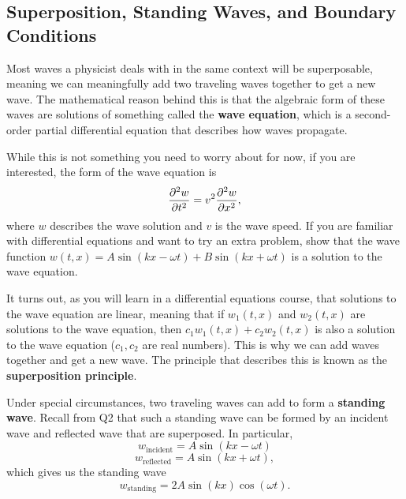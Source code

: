 \documentclass{article}
\begin{document}
\subsection*{Superposition, Standing Waves, and Boundary Conditions}

Most waves a physicist deals with in the same context will be superposable, meaning we can meaningfully add two traveling waves together to get a new wave. The mathematical reason behind this is that the algebraic form of these waves are solutions of something called the \textbf{wave equation}, which is a second-order partial differential equation that describes how waves propagate. 

\begin{tcolorbox}[arc=2mm, title=\textsc{The Wave Equation (Enrichment)}]
	While this is not something you need to worry about for now, if you are interested, the form of the wave equation is 
	\[
		\pdv[2]{w}{t} = v^2 \pdv[2]{w}{x},
	\]
	where $w$ describes the wave solution and $v$ is the wave speed. If you are familiar with differential equations and want to try an extra problem, show that the wave function $w(t,x) = A\sin(kx-\omega t) + B\sin(kx+\omega t)$ is a solution to the wave equation.
\end{tcolorbox}

It turns out, as you will learn in a differential equations course, that solutions to the wave equation are linear, meaning that if $w_1(t,x)$ and $w_2(t,x)$ are solutions to the wave equation, then $c_1 w_1(t,x) + c_2 w_2(t,x)$ is also a solution to the wave equation ($c_1,c_2$ are real numbers). This is why we can add waves together and get a new wave. The principle that describes this is known as the \textbf{superposition principle}.

\vspace{1em}

Under special circumstances, two traveling waves can add to form a \textbf{standing wave}. Recall from Q2 that such a standing wave can be formed by an incident wave and reflected wave that are superposed. In particular,
\begin{equation*}
	w_\text{incident} = A\sin(kx- \omega t) \tag{incident wave}
\end{equation*}
\begin{equation*}
	w_\text{reflected} = A\sin(kx + \omega t), \tag{reflected wave}
\end{equation*}
which gives us the standing wave
\begin{equation}
	w_\text{standing} = 2A\sin(kx)\cos(\omega t). \tag{standing wave}
\end{equation}
\end{document}
